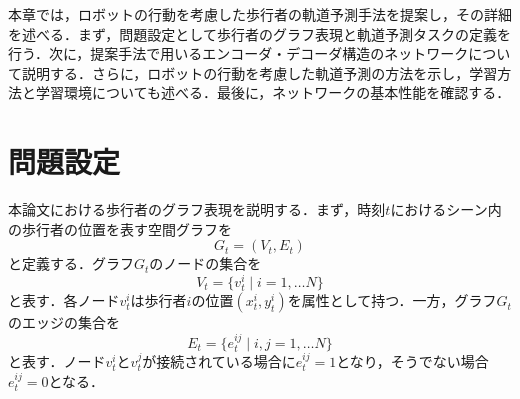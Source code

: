 


本章では，ロボットの行動を考慮した歩行者の軌道予測手法を提案し，その詳細を述べる．まず，問題設定として歩行者のグラフ表現と軌道予測タスクの定義を行う．次に，提案手法で用いるエンコーダ・デコーダ構造のネットワークについて説明する．さらに，ロボットの行動を考慮した軌道予測の方法を示し，学習方法と学習環境についても述べる．最後に，ネットワークの基本性能を確認する．



\section{問題設定}
本論文における歩行者のグラフ表現を説明する．まず，時刻$t$におけるシーン内の歩行者の位置を表す空間グラフを
\begin{equation}
  G_t = (V_t, E_t)
\end{equation}
と定義する．グラフ$G_t$のノードの集合を
\begin{equation}
  V_t = \{ v^i_t \mid i = 1, \dots N \}
\end{equation}
と表す．各ノード$v^i_t$は歩行者$i$の位置$(x^i_t, y^i_t)$を属性として持つ．一方，グラフ$G_t$のエッジの集合を
\begin{equation}
  E_t = \{ e^{ij}_t \mid i, j = 1, \dots N \}
\end{equation}
と表す．ノード$v^i_t$と$v^j_t$が接続されている場合に$e^{ij}_t=1$となり，そうでない場合$e^{ij}_t=0$となる．

